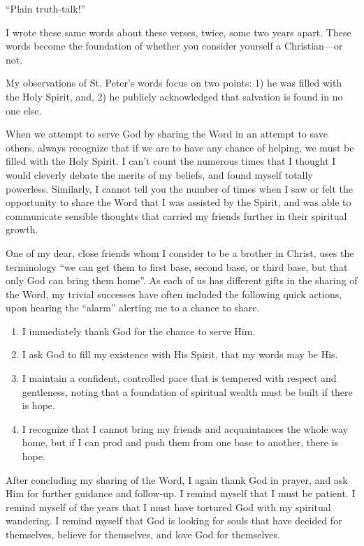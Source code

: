 \documentclass[12pt]{memoir}
\begin{document}
``Plain truth-talk!''

I wrote these same words about these verses, twice, some two years apart. These words become the foundation of whether you consider yourself
a Christian---or not.

My observations of St. Peter's words focus on two points: 1) he was filled with the Holy Spirit, and, 2) he publicly acknowledged that salvation is found in no one else.

When we attempt to serve God by sharing the Word in an attempt to
save others, always recognize that if we are to have any chance of
helping, we must be filled with the Holy Spirit. I can't count the
numerous times that I thought I would cleverly debate the merits of
my beliefs, and found myself totally powerless. Similarly, I cannot
tell you the number of times when I saw or felt the opportunity to
share the Word that I was assisted by the Spirit, and was able
to communicate sensible thoughts that carried my friends further in
their spiritual growth.

One of my dear, close friends whom I consider to be a brother in
Christ, uses the terminology ``we can get them to first base,
second base, or third base, but that only God can bring them home''.
As each of us has different gifts in the sharing of the Word, my trivial
successes have often included the following quick actions, upon
hearing the ``alarm'' alerting me to a chance to share.

\begin{enumerate}
\item I immediately thank God for the chance to serve Him.

\item I ask God to fill my existence with His Spirit, that my words may be His.

\item I maintain a confident, controlled pace that is tempered with respect and gentleness, noting that a foundation of spiritual wealth must be built if there is hope.

\item I recognize that I cannot bring my friends and acquaintances the whole way home, but if I can prod and push them from one base to another, there is hope. 
\end{enumerate}

After concluding my sharing of the Word, I again thank God in prayer, and ask Him for further guidance and follow-up. I remind myself that I must be patient. I remind myself of the years that I must have tortured God with my spiritual wandering. I remind myself that God is looking for souls that have decided for themselves, believe for themselves, and love God for themselves.
\end{document}

